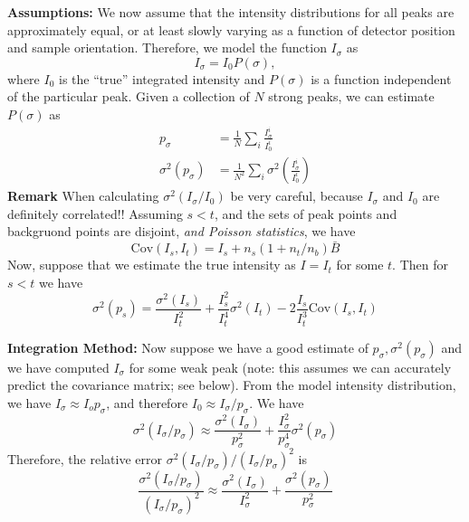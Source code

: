 \documentclass[11pt,a4paper]{article}
\def\cov{\mathrm{Cov}}
\begin{document}
\textbf{Assumptions:} We now assume that the intensity distributions for all peaks are approximately equal, or at least
slowly varying as a function of detector position and sample orientation. Therefore, we model the function $I_\sigma$ as
\begin{equation}
  I_\sigma = I_0 P(\sigma),
\end{equation}
where $I_0$ is the ``true'' integrated intensity and $P(\sigma)$ is a function independent of the particular peak. Given a collection of $N$ strong peaks, we can estimate $P(\sigma)$ as
\begin{align}
  p_\sigma &= \frac{1}{N} \sum_i \frac{I^i_\sigma}{I^i_0} \\
  \sigma^2(p_\sigma) &= \frac{1}{N^2} \sum_i \sigma^2\left(\frac{I^i_\sigma}{I^i_0}\right)
\end{align}
\textbf{Remark} When calculating $\sigma^2(I_\sigma / I_0)$ be very careful, because $I_\sigma$ and $I_0$ are definitely correlated!!
Assuming $s < t$, and the sets of peak points and backgruond points are disjoint, \emph{and Poisson statistics}, we have
\begin{equation}
  \cov(I_s, I_t) = I_s + n_s(1+n_t/n_b) \bar{B}
\end{equation}
Now, suppose that we estimate the true intensity as $I = I_t$ for some $t$. Then for $s < t$ we have
\begin{equation}
  \sigma^2(p_s) = \frac{\sigma^2(I_s)}{I_t^2} + \frac{I_s^2}{I_t^4} \sigma^2(I_t) - 2 \frac{I_s}{I_t^3} \cov(I_s, I_t)
\end{equation}

\textbf{Integration Method:} Now suppose we have a good estimate of $p_\sigma, \sigma^2(p_\sigma)$ and we have computed $I_\sigma$ for some
weak peak (note: this assumes we can accurately predict the covariance matrix; see below). From the model intensity distribution,
we have $I_\sigma \approx I_o p_\sigma$, and therefore $I_0 \approx I_\sigma / p_\sigma$. We have
\begin{equation}
  \sigma^2(I_\sigma / p_\sigma)
  \approx \frac{\sigma^2(I_\sigma)}{p_\sigma^2} + \frac{I^2_\sigma}{p_\sigma^4} \sigma^2(p_\sigma)
\end{equation}
Therefore, the relative error $\sigma^2(I_\sigma / p_\sigma) / (I_\sigma/p_\sigma)^2$ is
\begin{equation}
  \frac{\sigma^2(I_\sigma / p_\sigma)}{(I_\sigma/p_\sigma)^2}
  \approx \frac{\sigma^2(I_\sigma)}{I_\sigma^2} +  \frac{\sigma^2(p_\sigma)}{p_\sigma^2}
\end{equation}
\end{document}
